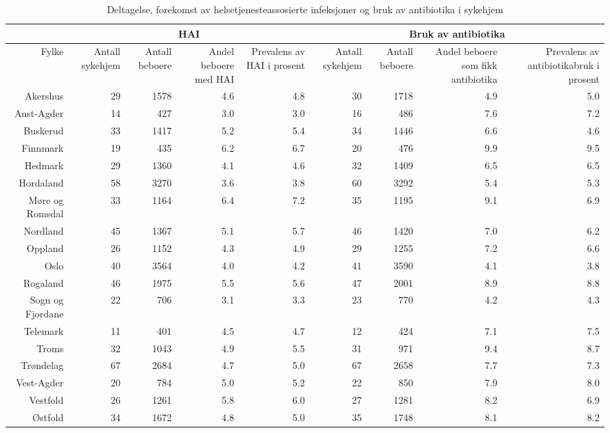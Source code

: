\documentclass[a4paper,12pt]{article}
\begin{document}
\begin{landscape}

\begin{table}[ht]
\centering
\caption{Deltagelse, forekomst av helsetjenesteassosierte infeksjoner og bruk av antibiotika i sykehjem} 
\begin{tabular}{|r||r|r|r|r||r|r|r|r|}
  \hline
  & \multicolumn{4}{c||}{HAI} & \multicolumn{4}{c|}{Bruk av antibiotika} \\
  \hline
 \multicolumn{1}{|r||}{Fylke} & \multicolumn{1}{p{1.0cm}}{Antall sykehjem} & \multicolumn{1}{p{1.1cm}}{Antall beboere} & \multicolumn{1}{p{1.5cm}}{Andel beboere med HAI} & \multicolumn{1}{p{1.6cm}||}{Prevalens av HAI i prosent} & \multicolumn{1}{p{1.0cm}}{Antall sykehjem} & \multicolumn{1}{p{1.1cm}}{Antall beboere} & \multicolumn{1}{p{2cm}}{Andel beboere som fikk antibiotika} & \multicolumn{1}{p{2.75cm}|}{Prevalens av antibiotikabruk i prosent}  \\
 \hline
Akershus & 29 & 1578 & 4.6 & 4.8 & 30 & 1718 & 4.9 & 5.0 \\ 
  Aust-Agder & 14 &  427 & 3.0 & 3.0 & 16 &  486 & 7.6 & 7.2 \\ 
  Buskerud & 33 & 1417 & 5.2 & 5.4 & 34 & 1446 & 6.6 & 4.6 \\ 
  Finnmark & 19 &  435 & 6.2 & 6.7 & 20 &  476 & 9.9 & 9.5 \\ 
  Hedmark & 29 & 1360 & 4.1 & 4.6 & 32 & 1409 & 6.5 & 6.5 \\ 
  Hordaland & 58 & 3270 & 3.6 & 3.8 & 60 & 3292 & 5.4 & 5.3 \\ 
  Møre og Romsdal & 33 & 1164 & 6.4 & 7.2 & 35 & 1195 & 9.1 & 6.9 \\ 
  Nordland & 45 & 1367 & 5.1 & 5.7 & 46 & 1420 & 7.0 & 6.2 \\ 
  Oppland & 26 & 1152 & 4.3 & 4.9 & 29 & 1255 & 7.2 & 6.6 \\ 
  Oslo & 40 & 3564 & 4.0 & 4.2 & 41 & 3590 & 4.1 & 3.8 \\ 
  Rogaland & 46 & 1975 & 5.5 & 5.6 & 47 & 2001 & 8.9 & 8.8 \\ 
  Sogn og Fjordane & 22 &  706 & 3.1 & 3.3 & 23 &  770 & 4.2 & 4.3 \\ 
  Telemark & 11 &  401 & 4.5 & 4.7 & 12 &  424 & 7.1 & 7.5 \\ 
  Troms & 32 & 1043 & 4.9 & 5.5 & 31 &  971 & 9.4 & 8.7 \\ 
  Trøndelag & 67 & 2684 & 4.7 & 5.0 & 67 & 2658 & 7.7 & 7.3 \\ 
  Vest-Agder & 20 &  784 & 5.0 & 5.2 & 22 &  850 & 7.9 & 8.0 \\ 
  Vestfold & 26 & 1261 & 5.8 & 6.0 & 27 & 1281 & 8.2 & 6.9 \\ 
  Østfold & 34 & 1672 & 4.8 & 5.0 & 35 & 1748 & 8.1 & 8.2 \\ 
   \hline
\end{tabular}
\end{table}

\end{landscape}
\end{document}
